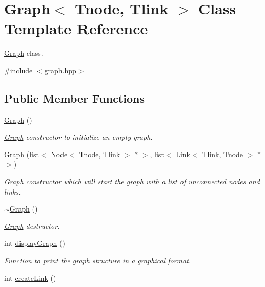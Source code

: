\hypertarget{classGraph}{\section{Graph$<$ Tnode, Tlink $>$ Class Template Reference}
\label{classGraph}
}


\hyperlink{classGraph}{Graph} class.  




{\ttfamily \#include $<$graph.\-hpp$>$}

\subsection*{Public Member Functions}
\begin{DoxyCompactItemize}
\item 
\hyperlink{classGraph_a083bf42042f9082408dd0d38951bf0e8}{Graph} ()
\begin{DoxyCompactList}\small\item\em \hyperlink{classGraph}{Graph} constructor to initialize an empty graph. \end{DoxyCompactList}\item 
\hypertarget{classGraph_aaa7b66697aa3278022f6dbd804e44028}{\hyperlink{classGraph_aaa7b66697aa3278022f6dbd804e44028}{Graph} (list$<$ \hyperlink{classNode}{Node}$<$ Tnode, Tlink $>$ $\ast$ $>$, list$<$ \hyperlink{classLink}{Link}$<$ Tlink, Tnode $>$ $\ast$ $>$)}\label{classGraph_aaa7b66697aa3278022f6dbd804e44028}

\begin{DoxyCompactList}\small\item\em \hyperlink{classGraph}{Graph} constructor which will start the graph with a list of unconnected nodes and links. \end{DoxyCompactList}\item 
\hyperlink{classGraph_a33e89e1711a29888c0059c7fd2d67cba}{$\sim$\-Graph} ()
\begin{DoxyCompactList}\small\item\em \hyperlink{classGraph}{Graph} destructor. \end{DoxyCompactList}\item 
int \hyperlink{classGraph_a50e03d4d8fe8e7ff2a231871f8cd6356}{display\-Graph} ()
\begin{DoxyCompactList}\small\item\em Function to print the graph structure in a graphical format. \end{DoxyCompactList}\item 
\hypertarget{classGraph_a495ce01388ef7c259ab3c35f2414bd76}{int \hyperlink{classGraph_a495ce01388ef7c259ab3c35f2414bd76}{create\-Link} ()}\label{classGraph_a495ce01388ef7c259ab3c35f2414bd76}


\end{DoxyCompactItemize}
